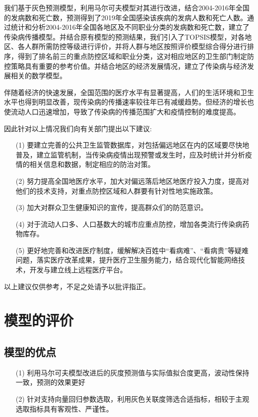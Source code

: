\documentclass{whutmod}
\begin{document}
  我们基于灰色预测模型，利用马尔可夫模型对其进行改进，结合2004-2016年全国的发病数和死亡数，预测得到了2019年全国感染该疾病的发病人数和死亡人数。通过统计和分析2004-2016年全国各地区及不同职业分类的发病数和死亡数，建立了传染病传播模型。并结合原有模型的预测结果，我们引入了TOPSIS模型，对各地区、各人群所需防控等级进行评价，并将人群与地区按照评价模型综合得分进行排序，得到了排名前三的重点防控区域和职业分类，这对相应地区的卫生部门制定防控策略具有重要的参考价值。并结合地区的经济发展情况，建立了传染病与经济发展相关的数学模型。
  
  伴随着经济的快速发展，全国范围的医疗水平有显著提高，人们的生活环境和卫生水平也得到明显改善，现传染病的传播速率较往年已有减缓趋势。但经济的增长也使流动人口迅速增加，导致了传染病的传播范围扩大和疫情控制的难度提高。 
  
  因此针对以上情况我们向有关部门提出以下建议:
  \begin{itemize}                                             
  	\item [(1)] 要建立完善的公共卫生监管数据库，对包括偏远地区在内的区域要尽快地普及，建立监管机制，当传染病疫情出现预警或发生时，应及时统计并分析疫情的相关信息和数据，制定相应的防治对策。
  	\item[(2)]努力提高全国地医疗水平，加大对偏远落后地区地医疗投入力度，提高对他们的技术支持，对重点防控区域和人群要有针对性地实施政策。
  	\item [(3)]加大对群众卫生健康知识的宣传，提高群众们的防范意识。
  	\item [(4)]对于流动人口多、人口基数大的城市应重点防控，增加各类流行传染病药物库存。
  	\item [(5)]更好地完善和改进医疗制度，缓解解决百姓中“看病难”、“看病贵”等疑难问题，落实医疗改革成果，提升医疗卫生服务能力，结合现代化智能网络技术，开发与建立线上远程医疗平台。	
  \end{itemize}
  以上建议仅供参考，不足之处请予以批评指正。
  
  
  
  \section{模型的评价}
  \subsection{模型的优点}
  \begin{itemize}                                             
  	\item [(1)] 利用马尔可夫模型改进后的灰度预测值与实际值拟合度更高，波动性保持一致，预测的效果更好
  	\item [(2)] 针对支持向量回归参数选取，利用灰色关联度筛选合适指标，相较于主观选取指标具有客观性、严谨性。	
  \end{itemize}
\end{document}
